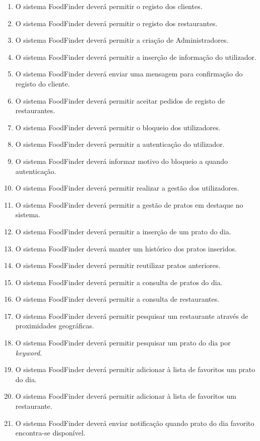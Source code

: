 \documentclass[a4paper,12pt]{report}
\begin{document}
\begin{enumerate}
\item O sistema FoodFinder deverá permitir o registo dos clientes.
\item O sistema FoodFinder deverá permitir o registo dos restaurantes.
\item O sistema FoodFinder deverá permitir a criação de Administradores.
\item O sistema FoodFinder deverá permitir a inserção de informação do utilizador.
\item O sistema FoodFinder deverá enviar uma mensagem para confirmação do registo do cliente.
\item O sistema FoodFinder deverá permitir aceitar pedidos de registo de restaurantes.
\item O sistema FoodFinder deverá permitir o bloqueio dos utilizadores.
\item O sistema FoodFinder deverá permitir a autenticação do utilizador.
\item O sistema FoodFinder deverá informar motivo do bloqueio a quando autenticação.
\item O sistema FoodFinder deverá permitir realizar a gestão dos utilizadores.
\item O sistema FoodFinder deverá permitir a gestão de pratos em destaque no sistema.
\bigskip
\bigskip
\bigskip
\item O sistema FoodFinder deverá permitir a inserção de um prato do dia.
\item O sistema FoodFinder deverá manter um histórico dos pratos inseridos.
\item O sistema FoodFinder deverá permitir reutilizar pratos anteriores.
\bigskip
\bigskip
\bigskip
\item O sistema FoodFinder deverá permitir a consulta de pratos do dia.
\item O sistema FoodFinder deverá permitir a consulta de restaurantes.
\item O sistema FoodFinder deverá permitir pesquisar um restaurante através de proximidades geográficas.
\item O sistema FoodFinder deverá permitir pesquisar um prato do dia por \textit{keyword}.
\item O sistema FoodFinder deverá permitir adicionar à lista de favoritos um prato do dia.
\item O sistema FoodFinder deverá permitir adicionar à lista de favoritos um restaurante.
\item O sistema FoodFinder deverá enviar notificação quando prato do dia favorito encontra-se disponível.
\end{enumerate}
\end{document}
